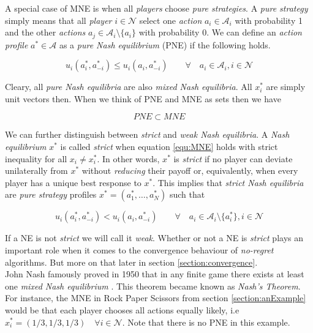 A special case of MNE is when all \textit{players} choose \textit{pure strategies}. A \textit{pure strategy} simply means that all \textit{player} $i \in \mathcal{N}$ select one \textit{action} $a_i \in \mathcal{A}_i$ with probability 1 and the other \textit{actions} $a_j \in \mathcal{A}_i \setminus \{a_i\}$ with probability 0. We can define an \textit{action profile} $a^* \in \mathcal{A}$ as a \textit{pure Nash equilibrium} (PNE) if the following holds.

\begin{equation}\label{equ:PNE}
    u_i(a_{i}^{*},a_{-i}^{*}) \le u_i(a_{i},a_{-i}^{*}) \qquad \forall \quad a_i \in \mathcal{A}_i, i \in \mathcal{N}
\end{equation}

Cleary, all \textit{pure Nash equilibria} are also \textit{mixed Nash equilibria}. All $x_{i}^{*}$ are simply unit vectors then. When we think of PNE and MNE as sets then we have 

\begin{equation*}
    PNE \subset MNE
\end{equation*}

We can further distinguish between \textit{strict} and \textit{weak Nash equilibria}. A \textit{Nash equilibrium} $x^*$ is called \textit{strict} when equation \ref{equ:MNE} holds with strict inequality for all $x_i \neq x_{i}^{*}$. In other words, $x^*$ is \textit{strict} if no player can deviate unilaterally from $x^*$ without \textit{reducing} their payoff or, equivalently, when every player has a unique best response to $x^*$. This implies that \textit{strict Nash equilibria} are \textit{pure strategy} profiles $x^* = (a_{1}^{*},\dots,a_{N}^{*})$ such that

\begin{equation}\label{equ:strictNE}
    u_i(a_{i}^{*},a_{-i}^{*}) < u_i(a_{i},a_{-i}^{*}) \qquad \forall \quad a_i \in \mathcal{A}_i \setminus \{a_{i}^{*}\} , i \in \mathcal{N}
\end{equation}

If a NE is not \textit{strict} we will call it \textit{weak}. Whether or not a NE is \textit{strict} plays an important role when it comes to the convergence behaviour of \textit{no-regret} algorithms. But more on that later in section \ref{section:convergence}. \\

John Nash famously proved in 1950 that in any finite game there exists at least one \textit{mixed Nash equilibrium} \cite{nash}. This theorem became known as \textit{Nash's Theorem}. For instance, the MNE in Rock Paper Scissors from section \ref{section:anExample} would be that each player chooses all actions equally likely, i.e $x_{i}^{*} = (1/3,1/3,1/3) \quad \forall i \in \mathcal{N}$. Note that there is no PNE in this example. \\

